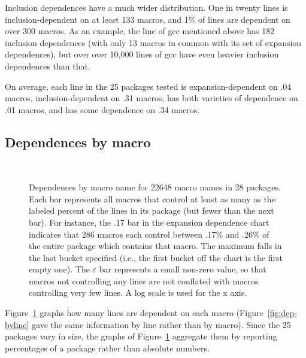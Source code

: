 \documentclass[10pt]{article}
\def\numdependpackages{25}
\newcommand{\pkg}[1]{\textsf{#1}}
\newcommand{\captionsmall}[1]{\caption[]{\small #1}}
\begin{document}
Inclusion dependences have a much wider distribution.  One in twenty lines
is inclusion-dependent on at least 133 macros, and 1\% of lines are
dependent on over 300 macros.  As an example, the line of \pkg{gcc}
mentioned above has 182 inclusion dependences (with only 13 macros in
common with its set of expansion dependences), but over over 10,000 lines
of \pkg{gcc} have even heavier inclusion dependences than that.

On average, each line in the {\numdependpackages} packages tested is 
expansion-dependent on .04 macros, inclusion-dependent on .31 macros, has
both varieties of dependence on .01 macros, and has some dependence on .34
macros.
      

\subsection{Dependences by macro}

\begin{figure}
\centerline{%
\ %
}
\captionsmall{Dependences by macro name for 22648 macro names in 28 packages.
  Each bar represents all macros that control at least as many as the
  labeled percent of the lines in its package (but fewer than the next
  bar).  For instance, the .17 bar in the expansion dependence chart
  indicates that 286 macros each control between .17\% and .26\% of the
  entire package which contains that macro.  The maximum falls in the last
  bucket specified (i.e., the first bucket off the chart is the first empty
  one).  The $\varepsilon$ bar represents a small non-zero value, so that
  macros not controlling any lines are not conflated with macros
  controlling very few lines.  A log scale is used for the x axis.}

\label{fig:dep-bymacro}
\end{figure}

Figure~\ref{fig:dep-bymacro} graphs how many lines are dependent on each
macro (Figure~\ref{fig:dep-byline} gave the same information by line rather
than by macro).  Since the {\numdependpackages} packages vary in size, the
graphs of Figure~\ref{fig:dep-bymacro} aggregate them by reporting
percentages of a package rather than absolute numbers.
\end{document}
